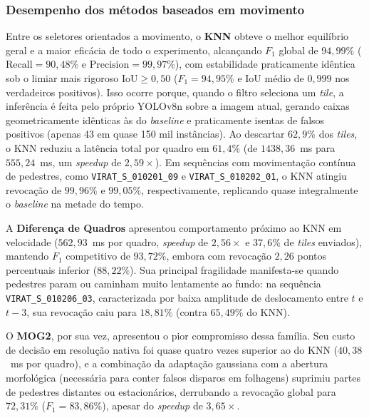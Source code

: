 \documentclass{ieeeaccess}
\begin{document}
\subsubsection{Desempenho dos métodos baseados em movimento}
Entre os seletores orientados a movimento, o \textbf{KNN} obteve o melhor equilíbrio geral e a maior eficácia de todo o experimento, alcançando $F_1$ global de $94{,}99\%$ ($\mathrm{Recall} = 90{,}48\%$ e $\mathrm{Precision} = 99{,}97\%$), com estabilidade praticamente idêntica sob o limiar mais rigoroso $\mathrm{IoU} \ge 0{,}50$ ($F_1 = 94{,}95\%$ e $\mathrm{IoU}$ médio de $0{,}999$ nos verdadeiros positivos). Isso ocorre porque, quando o filtro seleciona um \textit{tile}, a inferência é feita pelo próprio YOLOv8n sobre a imagem atual, gerando caixas geometricamente idênticas às do \textit{baseline} e praticamente isentas de falsos positivos (apenas 43 em quase 150 mil instâncias). Ao descartar $62{,}9\%$ dos \textit{tiles}, o KNN reduziu a latência total por quadro em $61{,}4\%$ (de $1438{,}36$~ms para $555{,}24$~ms, um \textit{speedup} de $2{,}59\times$). Em sequências com movimentação contínua de pedestres, como \texttt{VIRAT\_S\_010201\_09} e \texttt{VIRAT\_S\_010202\_01}, o KNN atingiu revocação de $99{,}96\%$ e $99{,}05\%$, respectivamente, replicando quase integralmente o \textit{baseline} na metade do tempo.

A \textbf{Diferença de Quadros} apresentou comportamento próximo ao KNN em velocidade ($562{,}93$~ms por quadro, \textit{speedup} de $2{,}56\times$ e $37{,}6\%$ de \textit{tiles} enviados), mantendo $F_1$ competitivo de $93{,}72\%$, embora com revocação $2{,}26$ pontos percentuais inferior ($88{,}22\%$). Sua principal fragilidade manifesta-se quando pedestres param ou caminham muito lentamente ao fundo: na sequência \texttt{VIRAT\_S\_010206\_03}, caracterizada por baixa amplitude de deslocamento entre $t$ e $t-3$, sua revocação caiu para $18{,}81\%$ (contra $65{,}49\%$ do KNN).

O \textbf{MOG2}, por sua vez, apresentou o pior compromisso dessa família. Seu custo de decisão em resolução nativa foi quase quatro vezes superior ao do KNN ($40{,}38$~ms por quadro), e a combinação da adaptação gaussiana com a abertura morfológica (necessária para conter falsos disparos em folhagens) suprimiu partes de pedestres distantes ou estacionários, derrubando a revocação global para $72{,}31\%$ ($F_1 = 83{,}86\%$), apesar do \textit{speedup} de $3{,}65\times$.
\end{document}
